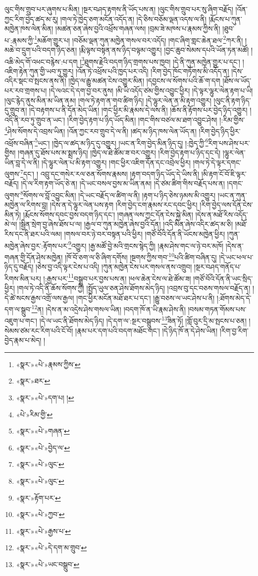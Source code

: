 ལུང་གིས་གྲུབ་པར་ཞུགས་པ་མིན། །སྔར་བཤད་རྟགས་ནི་ཡོད་པས་ན། །ལུང་གིས་གྲུབ་པར་སུ་ཞིག་བརྗོད། །འོན་ཀྱང་རིག་བྱེད་ཚད་མ་རུ། །གལ་ཏེ་ཁྱེད་ཅག་མངོན་འདོད་ན། །དེ་ཅིས་བཅོམ་ལྡན་འདས་ལ་ནི། །རྨོངས་པ་ཀུན་མཁྱེན་ཁས་ལེན་མིན། །མཚན་ཅན་ཞེས་བྱའི་འཕྲོས་གཞན་ལས། །བྲམ་ཟེ་མཁས་པ་རྣམས་ཀྱིས་ནི། །ཐུབ་པ་:རྣམས་ཀྱི་\footnote{«སྣར་»«པེ་»རྣམས་ཀྱིས་}མཆོག་གྱུར་པ། །བཅོམ་ལྡན་ཀུན་མཁྱེན་གསལ་བར་འདོད། །གང་ཞིག་གླང་ཆེན་ཐལ་\footnote{«སྣར་»ཐར་}ཀར་ནི། །མཆེ་བ་དྲུག་པའི་བདག་ཉིད་ཅན། །རྨི་ལྟས་བསྟན་ནས་ཉིད་བལྟམ་འགྱུར། །བྱང་ཆུབ་སེམས་དཔའི་ཡོན་ཏན་མཚོ། །འཆི་མེད་གོ་འཕང་བརྙེས་:པ་དག །\footnote{«སྣར་»«པེ་»དག་པ། །}ཐུགས་རྗེའི་བདག་ཉིད་གྲགས་པས་ཁྱབ། །དེ་ནི་ཀུན་མཁྱེན་གྱུར་པ་དང་། །འཇིག་རྟེན་ཀུན་གྱི་ཡབ་ཏུ་གྱུར། །འོན་ཏེ་འཕྲོས་པའི་ཁྱད་པར་འདི། །རིག་བྱེད་ཁོང་གཏོགས་མི་འདོད་ན། །དེས་འདིར་སྡང་བ་སྤངས་ནས་ནི། །ཁྱེད་ལ་རྒྱུ་མཚན་ངེས་འགྱུར་མིན། །དབྱངས་ལ་སོགས་པའི་ཆོ་ག་དག །ཐོས་ལ་ཡོད་པར་རབ་གྲགས་པ། །དེ་ལའང་དེ་དག་བྱ་བར་ནུས། །མི་ཡི་འདོད་ཙམ་གྱིས་འབྱུང་ཕྱིར། །དེ་ལྟར་ལྷུར་ལེན་རྟག་པ་ཡི། །ལུང་རྙེད་ནུས་མིན་མ་ཡིན་ནམ། །གལ་ཏེ་རྟག་ན་གབ་ཚིག་ཉིད། །དེ་ལྷུར་ལེན་ན་མི་རྟག་འགྱུར། །ལུང་ནི་རྟག་ཉིད་དུ་གྲུབ་ན། །དེ་བརྟགས་པ་ནི་དོན་མེད་ཡིན། །གང་ཕྱིར་མི་རྣམས་དེ་ལས་ནི། །ཆོས་ནི་རྟོགས་པར་བྱེད་ཉིད་འགྱུར། །འདི་ནི་རབ་ཏུ་གྲུབ་ན་ཡང་། །རིག་བྱེད་རྟག་པ་ཉིད་ཡོད་མིན། །གང་གིས་བཙལ་མ་ཐག་འབྱུང་ཤེས། །:རིམ་གྱིས་\footnote{«པེ་»རིམ་གྱི་}ཤེས་སོགས་དེ་འབྲས་ཡིན། །འོན་ཀྱང་རབ་གྲུབ་དེ་ལ་ནི། །ཚད་མ་ཉིད་ཁས་ལེན་ཡོད་ན། །རིག་བྱེད་ཉིད་ཕྱིར་འཕྲོས་བཞིན་\footnote{«སྣར་»«པེ་»གཞན་}ཡང་། །ཁྱེད་ལ་ཚད་མ་ཉིད་དུ་འགྱུར། །ཡང་ན་རིག་བྱེད་མིན་ཉིད་དུ། །:ཁྱེད་ཀྱི་\footnote{«སྣར་»«པེ་»བྱེད་ལ་}རིག་པས་ཤེས་པར་གྱིས། །གཞན་དུ་ཐོས་པས་མ་སྨྲས་ཉིད། །ཁྱེད་ལ་ཐེ་ཚོམ་ཟ་བར་འགྱུར། །རིག་བྱེད་རྟག་པ་ཉིད་དང་དེ། །ལྷུར་ལེན་ཡིན་བླ་དེ་ལ་ནི། །དེ་ལྷུར་ལེན་པ་མི་རྟག་འགྱུར། །གང་ཕྱིར་འཇིག་དོན་དང་འབྲེལ་ཕྱིར། །གལ་ཏེ་དེ་ལྟར་དགང་ལུགས་\footnote{«སྣར་»«པེ་»ལུང་}དང་། །
འབྲུ་དང་གསེར་རལ་ཅན་སོགས་རྣམས། །རྟག་བདག་ཉིད་ཡོད་དེ་ཡིས་ནི། །མི་རྟག་ངོ་བོ་ཇི་ལྟར་བརྗོད། །དེ་ལ་རིག་རྟག་ཡོད་ཅེ་ན། །དེ་ཡང་བསལ་བྱས་མ་ཡིན་ནམ། །དེ་ཙམ་ཚིག་གིས་བརྗོད་པས་ན། །དགང་ལུགས་\footnote{«སྣར་»«པེ་»ལུང་}སོགས་ལ་བློ་འབྱུང་མིན། །དེ་ཡང་བརྗོད་ལ་ཚིག་ལ་ནི། །རྟག་པ་ཉིད་ཅེས་ཉམས་མི་འགྱུར། །ཡང་ན་ཀུན་མཁྱེན་ལ་རིགས་བླ། །དེས་ན་དེ་ལྷུར་ལེན་པས་རྟག །རིག་བྱེད་ངག་རྣམས་རང་དབང་ཕྱིར། །རིག་བྱེད་ལས་དོན་ངེས་མིན་ཏེ། །རྨོངས་སོགས་དབང་བྱས་བདག་ཉིད་དང་། །གཞན་ལས་ཀྱང་དོན་ངེས་སྐྱེ་མིན། །དེས་ན་མཐོ་རིས་འདོད་མེ་ལ། །སྦྱིན་སྲེག་བྱ་ཞེས་ཐོས་པ་ལ། །རྒྱལ་བ་ཀུན་མཁྱེན་ཞེས་བྱའི་དོན། །འདི་མིན་ཞེས་འདིར་ཚད་མ་ཅི། །མཐོ་རིས་དང་ནི་ཐར་པའི་ལམ། །གསལ་བར་ཉེ་བར་བསྟན་པའི་ཕྱིར། །གཙོ་བོའི་དོན་ནི་ཡོངས་མཁྱེན་ཕྱིར། །ཀུན་མཁྱེན་ཞེས་བྱར་:རྟོགས་པར་\footnote{«སྣར་»རྟོག་པར་}འགྱུར། །རྒྱ་མཚོ་བྱེ་མའི་གྲངས་སྙེད་ཀྱི། །རྣམ་ཤེས་གང་ལ་ཉེ་བར་མཁོ། །དེས་ན་གཞན་གྱི་དོན་ཤེས་མཁྱེན། །ཁོ་བོ་ཅག་ལ་ཅི་ཞིག་དགོས། །སྔགས་ཀྱིས་གབ་\footnote{«སྣར་»«པེ་»ཀྱབ་}པའི་ཚིག་བཞིན་དུ། །དེ་ཡང་ཕལ་པ་ཉིད་དུ་བརྗོད། །ཅེས་བྱ་འདི་ལྟར་ངེས་པ་འདི། །ཀུན་མཁྱེན་ངེས་པར་གསལ་ནས་འགྲུབ། །སྔར་བཤད་གནོད་པ་རིགས་མིན་པར། །:རྒྱས་པར་\footnote{«སྣར་»«པེ་»རྒྱས་པ་}བསྒྲུབ་པར་བྱས་པས་ན། །ཕལ་ཆེན་ངེས་ལ་ཐེ་ཚོམ་ཟ། །གཙོ་བོའི་དོན་ནི་ཡང་སྲིད་ཕྱིར། །གལ་ཏེ་འདི་ནི་ཆོས་སོགས་ཀྱི། །སྤྱོད་ཡུལ་ཅན་ཤེས་ཐོགས་མེད་ཉིད། །འབྲས་བུ་དང་བཅས་གསལ་བརྗོད་ན། །དེ་ཚེ་སངས་རྒྱས་འགྲོ་ལས་རྒྱལ། །གང་ཕྱིར་མངོན་མཐོ་ཐར་པ་དང་། །རྒྱུ་བཅས་ལ་ཡང་ཤེས་པ་ནི། །:ཐོགས་མེད་དེ་དག་ལ་སྒྲུབ་\footnote{«སྣར་»«པེ་»དེ་དག་མ་གྲུབ་}ན། །དེས་ན་མ་འདྲེས་ཤེས་གསལ་ཡིན། །བདག་ཁོ་ན་ཡི་རྣམ་ཤེས་ནི། །བསམ་གཏན་གོམས་པས་འཇུག་པ་གང་། །དེ་ལ་ཡང་ནི་ཐོགས་མེད་ཉིད། །དེ་དག་ལ་:སྔར་བསྒྲུབས་\footnote{«སྣར་»«པེ་»ཡང་བསྒྲུབ་}ཟིན་ཏོ། །གློ་བུར་དྲི་མ་སྤངས་པ་ཅན། །སེམས་ཙམ་རང་རིག་པའི་ངོ་བོ། །རྣམ་པར་དག་པའི་བདག་མཐོང་གང་། །དེ་ཉིད་ཁོ་ན་དེ་ཤེས་ཡིན། །རིག་བྱ་རིག་བྱེད་རྣམ་པ་མེད། །
